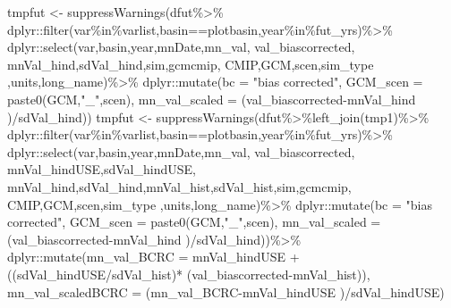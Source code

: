 \documentclass[
]{article}
\newenvironment{Shaded}{\begin{snugshade}}{\end{snugshade}}
\newcommand{\AttributeTok}[1]{\textcolor[rgb]{0.77,0.63,0.00}{#1}}
\newcommand{\FunctionTok}[1]{\textcolor[rgb]{0.00,0.00,0.00}{#1}}
\newcommand{\NormalTok}[1]{#1}
\newcommand{\OtherTok}[1]{\textcolor[rgb]{0.56,0.35,0.01}{#1}}
\newcommand{\SpecialCharTok}[1]{\textcolor[rgb]{0.00,0.00,0.00}{#1}}
\newcommand{\StringTok}[1]{\textcolor[rgb]{0.31,0.60,0.02}{#1}}
\begin{document}
\begin{Shaded}
\begin{Highlighting}[]
       
\NormalTok{       tmpfut    }\OtherTok{\textless{}{-}}  \FunctionTok{suppressWarnings}\NormalTok{(dfut}\SpecialCharTok{\%\textgreater{}\%}
\NormalTok{         dplyr}\SpecialCharTok{::}\FunctionTok{filter}\NormalTok{(var}\SpecialCharTok{\%in\%}\NormalTok{varlist,basin}\SpecialCharTok{==}\NormalTok{plotbasin,year}\SpecialCharTok{\%in\%}\NormalTok{fut\_yrs)}\SpecialCharTok{\%\textgreater{}\%}
\NormalTok{         dplyr}\SpecialCharTok{::}\FunctionTok{select}\NormalTok{(var,basin,year,mnDate,mn\_val, val\_biascorrected, }
\NormalTok{                       mnVal\_hind,sdVal\_hind,sim,gcmcmip,}
\NormalTok{                       CMIP,GCM,scen,sim\_type ,units,long\_name)}\SpecialCharTok{\%\textgreater{}\%}         
\NormalTok{         dplyr}\SpecialCharTok{::}\FunctionTok{mutate}\NormalTok{(}\AttributeTok{bc =} \StringTok{"bias corrected"}\NormalTok{,}
                       \AttributeTok{GCM\_scen =} \FunctionTok{paste0}\NormalTok{(GCM,}\StringTok{"\_"}\NormalTok{,scen),}
                       \AttributeTok{mn\_val\_scaled =}  
\NormalTok{                         (val\_biascorrected}\SpecialCharTok{{-}}\NormalTok{mnVal\_hind )}\SpecialCharTok{/}\NormalTok{sdVal\_hind))}
\NormalTok{        tmpfut    }\OtherTok{\textless{}{-}}  \FunctionTok{suppressWarnings}\NormalTok{(dfut}\SpecialCharTok{\%\textgreater{}\%}\FunctionTok{left\_join}\NormalTok{(tmp1)}\SpecialCharTok{\%\textgreater{}\%}
\NormalTok{         dplyr}\SpecialCharTok{::}\FunctionTok{filter}\NormalTok{(var}\SpecialCharTok{\%in\%}\NormalTok{varlist,basin}\SpecialCharTok{==}\NormalTok{plotbasin,year}\SpecialCharTok{\%in\%}\NormalTok{fut\_yrs)}\SpecialCharTok{\%\textgreater{}\%}
\NormalTok{         dplyr}\SpecialCharTok{::}\FunctionTok{select}\NormalTok{(var,basin,year,mnDate,mn\_val, val\_biascorrected,}
\NormalTok{                        mnVal\_hindUSE,sdVal\_hindUSE,}
\NormalTok{                       mnVal\_hind,sdVal\_hind,mnVal\_hist,sdVal\_hist,sim,gcmcmip,}
\NormalTok{                       CMIP,GCM,scen,sim\_type ,units,long\_name)}\SpecialCharTok{\%\textgreater{}\%}         
\NormalTok{         dplyr}\SpecialCharTok{::}\FunctionTok{mutate}\NormalTok{(}\AttributeTok{bc =} \StringTok{"bias corrected"}\NormalTok{,}
                       \AttributeTok{GCM\_scen =} \FunctionTok{paste0}\NormalTok{(GCM,}\StringTok{"\_"}\NormalTok{,scen),}
                       \AttributeTok{mn\_val\_scaled =}  
\NormalTok{                         (val\_biascorrected}\SpecialCharTok{{-}}\NormalTok{mnVal\_hind )}\SpecialCharTok{/}\NormalTok{sdVal\_hind))}\SpecialCharTok{\%\textgreater{}\%}
\NormalTok{          dplyr}\SpecialCharTok{::}\FunctionTok{mutate}\NormalTok{(}\AttributeTok{mn\_val\_BCRC =}\NormalTok{ mnVal\_hindUSE }\SpecialCharTok{+}\NormalTok{ ((sdVal\_hindUSE}\SpecialCharTok{/}\NormalTok{sdVal\_hist)}\SpecialCharTok{*}
\NormalTok{                                                      (val\_biascorrected}\SpecialCharTok{{-}}\NormalTok{mnVal\_hist)), }
                     \AttributeTok{mn\_val\_scaledBCRC =}\NormalTok{ (mn\_val\_BCRC}\SpecialCharTok{{-}}\NormalTok{mnVal\_hindUSE )}\SpecialCharTok{/}\NormalTok{sdVal\_hindUSE)}



\end{Highlighting}
\end{Shaded}
\end{document}
